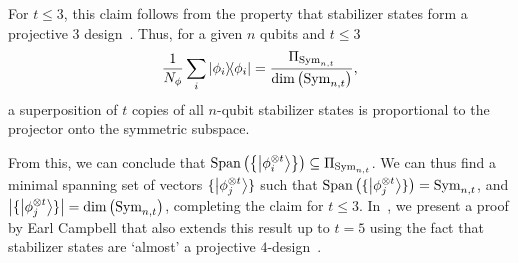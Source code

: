 For $t\leq 3$, this claim follows from the property that stabilizer states form a projective $3$ design~\cite{Zhu2016}. Thus, for a given $n$ qubits and $t\leq 3$
\begin{equation}
\frac{1}{N_{\phi}}\sum_{i}\ketbra{\phi_{i}}=\frac{\Pi_{\text{Sym}_{n,t}}}{\text{dim}\left(\text{Sym}_{n,t}\right)},
\end{equation}
a superposition of $t$ copies of all $n$-qubit stabilizer states is proportional to the projector onto the symmetric subspace.\par
From this, we can conclude that $\text{Span}\left(\left\{\ket{\phi_{i}^{\otimes t}}\right\}\right)\subseteq \Pi_{\text{Sym}_{n,t}}$. We can thus find a minimal spanning set of vectors $\{\ket{\phi_{j}^{\otimes t}}\}$ such that $\text{Span}\left(\{\ket{\phi_{j}^{\otimes t}}\}\right)=\text{Sym}_{n,t}$, and $\left|\{\ket{\phi_{j}^{\otimes t}}\}\right|=\text{dim}\left(\text{Sym}_{n,t}\right)$, completing the claim for $t\leq 3$. In~\cite{Bravyi2018}, we present a proof by Earl Campbell that also extends this result up to $t=5$ using the fact that stabilizer states are `almost' a projective $4$-design~\cite{Zhu2016}.

